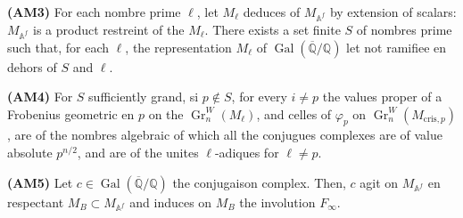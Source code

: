 \documentclass[12pt,a4paper]{article}
\theoremstyle{plain}
\theoremstyle{definition}
\theoremstyle{remark}
\DeclareMathOperator{\Gal}{Gal}
\DeclareMathOperator{\Gr}{Gr}
\providecommand{\Gal}{\operatorname{Gal}}
\providecommand{\cris}{\mathrm{cris}}
\begin{document}
\textbf{(AM3)} For each nombre prime $\ell$, let $M_\ell$ deduces of
$M_{\mathbb{A}^f}$ by extension of scalars: $M_{\mathbb{A}^f}$ is a product restreint
of the $M_\ell$. There exists a set finite $S$ of nombres prime such that, for each
$\ell$, the representation $M_\ell$ of $\Gal(\overline{\mathbb{Q}}/\mathbb{Q})$ let not ramifiee
en dehors of $S$ and $\ell$.

\textbf{(AM4)} For $S$ sufficiently grand, si $p \notin S$, for every $i \neq p$ the values
proper of a Frobenius geometric en $p$ on the $\Gr^W_n(M_\ell)$, and celles of
$\varphi_p$ on $\Gr^W_n(M_{\cris,p})$, are of the nombres algebraic of which all the
conjugues complexes are of value absolute $p^{n/2}$, and are of the unites
$\ell$-adiques for $\ell \neq p$.

\textbf{(AM5)} Let $c \in \Gal(\overline{\mathbb{Q}}/\mathbb{Q})$ the conjugaison complex. Then,
$c$ agit on $M_{\mathbb{A}^f}$ en respectant $M_B \subset M_{\mathbb{A}^f}$ and induces on
$M_B$ the involution $F_\infty$.
\end{document}
